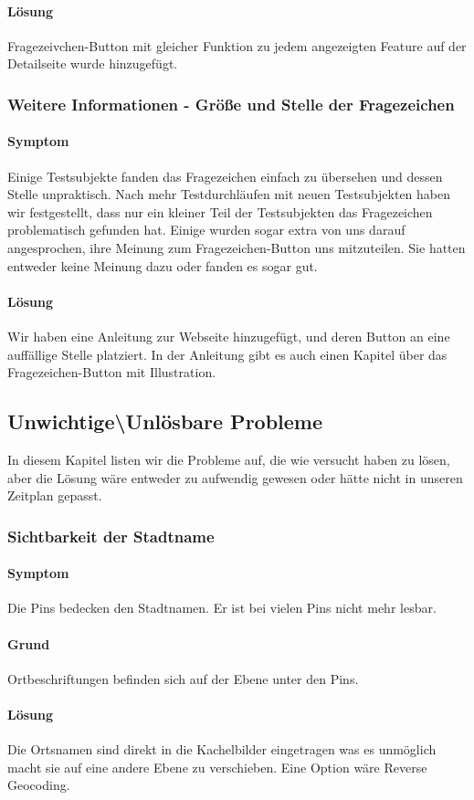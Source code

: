 \paragraph{Lösung}
Fragezeivchen-Button mit gleicher Funktion zu jedem angezeigten Feature auf der Detailseite wurde hinzugefügt.

\subsubsection{Weitere Informationen - Größe und Stelle der Fragezeichen}

\paragraph{Symptom}
Einige Testsubjekte fanden das Fragezeichen einfach zu übersehen und dessen Stelle unpraktisch. Nach mehr Testdurchläufen mit neuen Testsubjekten haben wir festgestellt, dass nur ein kleiner Teil der Testsubjekten das Fragezeichen problematisch gefunden hat. Einige wurden sogar extra von uns darauf angesprochen, ihre Meinung zum Fragezeichen-Button uns mitzuteilen. Sie hatten entweder keine Meinung dazu oder fanden es sogar gut.

\paragraph{Lösung}
Wir haben eine Anleitung zur Webseite hinzugefügt, und deren Button an eine auffällige Stelle platziert. In der Anleitung gibt es auch einen Kapitel über das Fragezeichen-Button mit Illustration. 


\subsection{Unwichtige\textbackslash Unlösbare Probleme}

In diesem Kapitel listen wir die Probleme auf, die wie versucht haben zu lösen, aber die Lösung wäre entweder zu aufwendig gewesen oder hätte nicht in unseren Zeitplan gepasst.


\subsubsection{Sichtbarkeit der Stadtname}
\paragraph{Symptom}
Die Pins bedecken den Stadtnamen. Er ist bei vielen Pins nicht mehr lesbar.

\paragraph{Grund}
Ortbeschriftungen befinden sich auf der Ebene unter den Pins. 

\paragraph{Lösung}
Die Ortsnamen sind direkt in die Kachelbilder eingetragen was es unmöglich macht sie 
auf eine andere Ebene zu verschieben. Eine Option wäre Reverse Geocoding.
